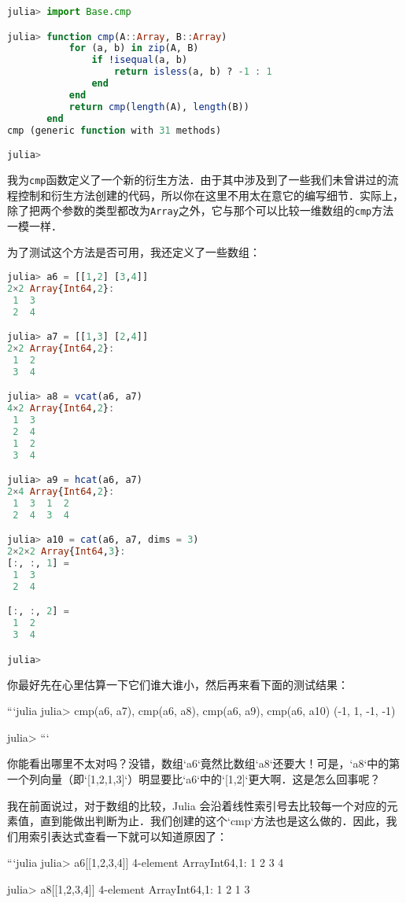 \begin{lstlisting}[language=julia]
julia> import Base.cmp

julia> function cmp(A::Array, B::Array)
           for (a, b) in zip(A, B)
               if !isequal(a, b)
                   return isless(a, b) ? -1 : 1
               end
           end
           return cmp(length(A), length(B))
       end
cmp (generic function with 31 methods)

julia>
\end{lstlisting}

我为\verb|cmp|函数定义了一个新的衍生方法．由于其中涉及到了一些我们未曾讲过的流程控制和衍生方法创建的代码，所以你在这里不用太在意它的编写细节．实际上，除了把两个参数的类型都改为\verb|Array|之外，它与那个可以比较一维数组的\verb|cmp|方法一模一样．

为了测试这个方法是否可用，我还定义了一些数组：

\begin{lstlisting}[language=julia]
julia> a6 = [[1,2] [3,4]]
2×2 Array{Int64,2}:
 1  3
 2  4

julia> a7 = [[1,3] [2,4]]
2×2 Array{Int64,2}:
 1  2
 3  4

julia> a8 = vcat(a6, a7)
4×2 Array{Int64,2}:
 1  3
 2  4
 1  2
 3  4

julia> a9 = hcat(a6, a7)
2×4 Array{Int64,2}:
 1  3  1  2
 2  4  3  4

julia> a10 = cat(a6, a7, dims = 3)
2×2×2 Array{Int64,3}:
[:, :, 1] =
 1  3
 2  4

[:, :, 2] =
 1  2
 3  4

julia> 
\end{lstlisting}

你最好先在心里估算一下它们谁大谁小，然后再来看下面的测试结果：

```julia
julia> cmp(a6, a7), cmp(a6, a8), cmp(a6, a9), cmp(a6, a10)
(-1, 1, -1, -1)

julia> 
```

你能看出哪里不太对吗？没错，数组`a6`竟然比数组`a8`还要大！可是，`a8`中的第一个列向量（即`[1,2,1,3]`）明显要比`a6`中的`[1,2]`更大啊．这是怎么回事呢？

我在前面说过，对于数组的比较，Julia 会沿着线性索引号去比较每一个对应的元素值，直到能做出判断为止．我们创建的这个`cmp`方法也是这么做的．因此，我们用索引表达式查看一下就可以知道原因了：

```julia
julia> a6[[1,2,3,4]]
4-element Array{Int64,1}:
 1
 2
 3
 4

julia> a8[[1,2,3,4]]
4-element Array{Int64,1}:
 1
 2
 1
 3

